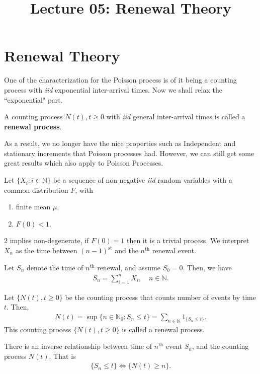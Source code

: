 \documentclass[a4paper,10pt, english]{article}
\title{Lecture 05: Renewal Theory}
\author{}
\begin{document}
\maketitle

\section{Renewal Theory}
One of the characterization for the Poisson process is of it being a counting process with \emph{iid} exponential inter-arrival times. Now we shall relax the ``exponential" part. 
\begin{defn} A counting process ${N(t),t \geq 0}$ with \emph{iid} general inter-arrival times is called a \textbf{renewal process}.
\end{defn}
As a result, we no longer have the nice properties such as Independent and stationary increments that Poisson processes had. However, we can still get some great results which also apply to Poisson Processes. 

\begin{defn} Let $\{X_i: i \in \mathbb{N}\}$ be a sequence of non-negative \emph{iid} random variables with a common distribution $F$, with 
	\begin{enumerate}
		\item finite mean $\mu$, %
		\item $F(0) < 1$.%
	\end{enumerate}
\end{defn}
$2$ implies non-degenerate, if $F(0) = 1$ then it is a trivial process. We interpret $X_n$ as the time between $(n - 1)^{\mathrm{st}}$ and the $n^{\mathrm{th}}$ renewal event. 

\begin{defn} Let $S_n$ denote the time of $n^{\mathrm{th}}$ renewal, and assume $S_0 = 0$. Then, we have
	\begin{align*} 
	S_n = \sum_{i=1}^n X_i, \quad n\in \mathbb{N}. 
	\end{align*}
\end{defn}
\begin{defn} Let $\{N(t), t \geq 0\}$ be the counting process that counts number of events by time $t$. Then,
	\begin{align*} 
	N(t) = \sup\{n \in \mathbb{N}_0 : S_n \leq t\} = \sum_{n \in \mathbb{N}}1_{\{S_n \leq t\}}.
	\end{align*} 
	This counting process $\{N(t), t \geq 0\}$ is called a renewal process.
\end{defn}
\begin{lem}
	There is an inverse relationship between time of $n^{\mathrm{th}}$ event $S_n$, and the counting process $N(t)$. That is
	\begin{align}
	\label{eq:InverseRelationship}
	\{S_n \leq t\} \iff \{N(t) \geq n\}.
	\end{align}
\end{lem}
\end{document}
